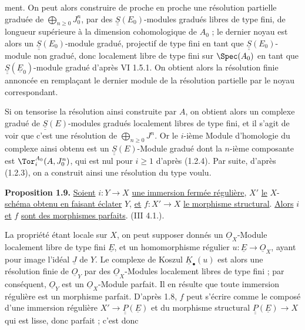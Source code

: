 
ment. On peut alors construire de proche en proche une résolution partielle graduée de \(\bigoplus_{n\ge0}J_0^n\), par des \(\underline{\underline{S}}(E_0)\)-modules gradués libres de type fini, de longueur supérieure à la dimension cohomologique de \(A_0\) ; le dernier noyau est alors un \(\underline{\underline{S}}(E_0)\)-module gradué, projectif de type fini en tant que \(\underline{\underline{S}}(E_0)\)-module non gradué, donc localement libre de type fini sur \(\Spec(A_0)\) en tant que \(\underline{\underline{S}}(\underline{E}_0)\)-module gradué d'après VI 1.5.1. On obtient alors la résolution finie annoncée en remplaçant le dernier module de la résolution partielle par le noyau correspondant.

Si on tensorise la résolution ainsi construite par \(A\), on obtient alors un complexe gradué de \(\underline{\underline{S}}(E)\)-modules gradués localement libres de type fini, et il s'agit de voir que c'est une résolution de \(\bigoplus_{n\ge0}J^n\). Or le \(i\)-ième Module d'homologie du complexe ainsi obtenu est un \(\underline{\underline{S}}(E)\)-Module gradué dont la \(n\)-ième composante est \(\Tor_i^{A_0}(A,J_0^n)\), qui est nul pour \(i\ge1\) d'après (1.2.4). Par suite, d'après (1.2.3), on a construit ainsi une résolution du type voulu.

\textbf{Proposition 1.9.} \uline{Soient} \(i:Y\to X\) \uline{une immersion fermée régulière}, \(X'\) \uline{le} \(X\)-\uline{schéma obtenu en faisant éclater} \(Y\), \uline{et} \(f:X'\to X\) \uline{le morphisme structural}. \uline{Alors} \(i\) \uline{et} \(f\) \uline{sont des morphismes parfaits}. (III 4.1.).

La propriété étant locale sur \(X\), on peut supposer donnés un \(\underline{O}_X\)-Module localement libre de type fini \(\underline{E}\), et un homomorphisme régulier \(u:\underline{E}\to\underline{O}_X\), ayant pour image l'idéal \(\underline{J}\) de \(Y\). Le complexe de Koszul \(\underline{K}_\bullet(u)\) est alors une résolution finie de \(\underline{O}_Y\) par des \(\underline{O}_X\)-Modules localement libres de type fini ; par conséquent, \(\underline{O}_Y\) est un \(\underline{O}_X\)-Module parfait. Il en résulte que toute immersion régulière est un morphisme parfait. D'après 1.8, \(f\) peut s'écrire comme le composé d'une immersion régulière \(X'\to\underline{\underline{P}}(\underline{E})\) et du morphisme structural \(\underline{\underline{P}}(\underline{E})\to X\) qui est lisse, donc parfait ; c'est donc
